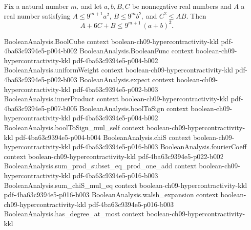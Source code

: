\begin{lemma}
\label{BooleanAnalysis.Hypercontractivity.bonami_algebra}
\leanok
{}
Fix a natural number $m$, and let $a, b, B, C$ be nonnegative real numbers and $A$ a
real number satisfying $A \le 9^{m+1} a^2$, $B \le 9^m b^2$, and $C^2 \le A B$. Then
\[
A + 6C + B \le 9^{m+1}\,(a+b)^2.
\]
\end{lemma}

\begin{lemma}
\label{BooleanAnalysis.Hypercontractivity.bonami_expect}
\leanok
{}
\proofstep
  {BooleanAnalysis.BoolCube}
  {context}
  {boolean-ch09-hypercontractivity-kkl}
  {pdf-4ba63c9394e5-p004-b002}
\proofstep
  {BooleanAnalysis.BooleanFunc}
  {context}
  {boolean-ch09-hypercontractivity-kkl}
  {pdf-4ba63c9394e5-p004-b002}
\proofstep
  {BooleanAnalysis.uniformWeight}
  {context}
  {boolean-ch09-hypercontractivity-kkl}
  {pdf-4ba63c9394e5-p002-b003}
\proofstep
  {BooleanAnalysis.expect}
  {context}
  {boolean-ch09-hypercontractivity-kkl}
  {pdf-4ba63c9394e5-p002-b003}
\proofstep
  {BooleanAnalysis.innerProduct}
  {context}
  {boolean-ch09-hypercontractivity-kkl}
  {pdf-4ba63c9394e5-p007-b005}
\proofstep
  {BooleanAnalysis.boolToSign}
  {context}
  {boolean-ch09-hypercontractivity-kkl}
  {pdf-4ba63c9394e5-p004-b002}
\proofstep
  {BooleanAnalysis.boolToSign_mul_self}
  {context}
  {boolean-ch09-hypercontractivity-kkl}
  {pdf-4ba63c9394e5-p004-b004}
\proofstep
  {BooleanAnalysis.chiS}
  {context}
  {boolean-ch09-hypercontractivity-kkl}
  {pdf-4ba63c9394e5-p016-b003}
\proofstep
  {BooleanAnalysis.fourierCoeff}
  {context}
  {boolean-ch09-hypercontractivity-kkl}
  {pdf-4ba63c9394e5-p022-b002}
\proofstep
  {BooleanAnalysis.sum_prod_subset_eq_prod_one_add}
  {context}
  {boolean-ch09-hypercontractivity-kkl}
  {pdf-4ba63c9394e5-p016-b003}
\proofstep
  {BooleanAnalysis.sum_chiS_mul_eq}
  {context}
  {boolean-ch09-hypercontractivity-kkl}
  {pdf-4ba63c9394e5-p016-b003}
\proofstep
  {BooleanAnalysis.walsh_expansion}
  {context}
  {boolean-ch09-hypercontractivity-kkl}
  {pdf-4ba63c9394e5-p016-b003}
\proofstep
  {BooleanAnalysis.has_degree_at_most}
  {context}
  {boolean-ch09-hypercontractivity-kkl}

\end{lemma}
